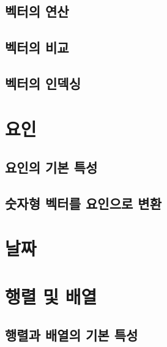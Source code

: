 \documentclass[
]{book}
\begin{document}
\hypertarget{uxbca1uxd130uxc758-uxc5f0uxc0b0}{%
\subsection{벡터의 연산}\label{uxbca1uxd130uxc758-uxc5f0uxc0b0}}

\hypertarget{uxbca1uxd130uxc758-uxbe44uxad50}{%
\subsection{벡터의 비교}\label{uxbca1uxd130uxc758-uxbe44uxad50}}

\hypertarget{uxbca1uxd130uxc758-uxc778uxb371uxc2f1}{%
\subsection{벡터의 인덱싱}\label{uxbca1uxd130uxc758-uxc778uxb371uxc2f1}}

\hypertarget{uxc694uxc778}{%
\section{요인}\label{uxc694uxc778}}

\hypertarget{uxc694uxc778uxc758-uxae30uxbcf8-uxd2b9uxc131}{%
\subsection{요인의 기본 특성}\label{uxc694uxc778uxc758-uxae30uxbcf8-uxd2b9uxc131}}

\hypertarget{uxc22buxc790uxd615-uxbca1uxd130uxb97c-uxc694uxc778uxc73cuxb85c-uxbcc0uxd658}{%
\subsection{숫자형 벡터를 요인으로 변환}\label{uxc22buxc790uxd615-uxbca1uxd130uxb97c-uxc694uxc778uxc73cuxb85c-uxbcc0uxd658}}

\hypertarget{uxb0a0uxc9dc}{%
\section{날짜}\label{uxb0a0uxc9dc}}

\hypertarget{uxd589uxb82c-uxbc0f-uxbc30uxc5f4}{%
\section{행렬 및 배열}\label{uxd589uxb82c-uxbc0f-uxbc30uxc5f4}}

\hypertarget{uxd589uxb82cuxacfc-uxbc30uxc5f4uxc758-uxae30uxbcf8-uxd2b9uxc131}{%
\subsection{행렬과 배열의 기본 특성}\label{uxd589uxb82cuxacfc-uxbc30uxc5f4uxc758-uxae30uxbcf8-uxd2b9uxc131}}
\end{document}
